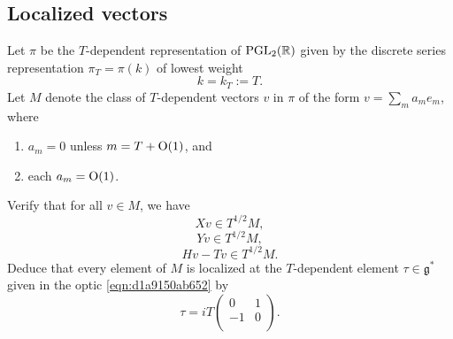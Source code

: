 \documentclass[reqno]{amsart} 
\numberwithin{equation}{section}
\numberwithin{theorem}{section}
\begin{document}
\subsection{Localized vectors}\label{sec:d1a9162ea6e6}

\begin{exercise}
  Let $\pi$ be the $T$-dependent representation of $\operatorname{PGL}_2(\mathbb{R})$ given by the discrete series representation $\pi_T = \pi(k)$ of lowest weight
  \begin{equation*}
    k = k_T :=T.
  \end{equation*}
  Let $M$ denote the class of $T$-dependent vectors $v$ in $\pi$ of the form $v = \sum_m a_m e_m$, where
  \begin{enumerate}
  \item $a_m = 0$ unless $m = T + \operatorname{O}(1)$, and
  \item each $a_m = \operatorname{O}(1)$.
  \end{enumerate}
  Verify that for all $v \in M$, we have
  \begin{equation*}
X v \in T^{1/2} M,
\end{equation*}
\begin{equation*}
Y v \in T^{1/2} M,
\end{equation*}
\begin{equation*}
H v - T v \in T^{1/2} M.
\end{equation*}
Deduce that every element of $M$ is localized at the $T$-dependent element $\tau \in \mathfrak{g}^*$ given in the optic \eqref{eqn:d1a9150ab652} by
\begin{equation*}
  \tau =
  i T \begin{pmatrix}
0 & 1 \\
-1 & 0 \\
\end{pmatrix}.
\end{equation*}
\end{exercise}
\end{document}
